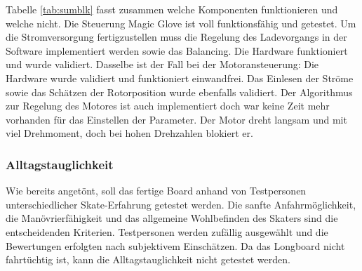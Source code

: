 Tabelle \ref{tab:sumblk} fasst zusammen welche Komponenten funktionieren und welche nicht. Die Steuerung Magic Glove ist voll funktionsfähig und getestet. Um die Stromversorgung fertigzustellen muss die Regelung des Ladevorgangs in der Software implementiert werden sowie das Balancing. Die Hardware funktioniert und wurde validiert. Dasselbe ist der Fall bei der Motoransteuerung: Die Hardware wurde validiert und funktioniert einwandfrei. Das Einlesen der Ströme sowie das Schätzen der Rotorposition wurde ebenfalls validiert. Der Algorithmus zur Regelung des Motores ist auch implementiert doch war keine Zeit mehr vorhanden für das Einstellen der Parameter. Der Motor dreht langsam und mit viel Drehmoment, doch bei hohen Drehzahlen blokiert er.

\subsubsection*{Alltagstauglichkeit} \label{ValidAlltag}
Wie bereits angetönt, soll das fertige Board anhand von Testpersonen unterschiedlicher Skate-Erfahrung getestet werden. Die sanfte Anfahrmöglichkeit, die Manövrierfähigkeit und das allgemeine Wohlbefinden des Skaters sind die entscheidenden Kriterien. 
Testpersonen werden zufällig ausgewählt und die Bewertungen erfolgten nach subjektivem Einschätzen. 
Da das Longboard nicht fahrtüchtig ist, kann die Alltagstauglichkeit nicht getestet werden.

